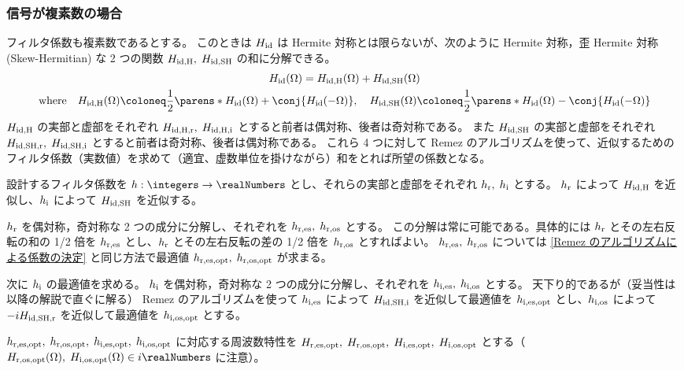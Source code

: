         \subsubsection{信号が複素数の場合}
            フィルタ係数も複素数であるとする。
            このときは $H_{\text{id}}$ は Hermite 対称とは限らないが、次のように Hermite 対称，歪 Hermite 対称 (Skew-Hermitian) な 2 つの関数 $H_{\text{id,H}},\;H_{\text{id,SH}}$ の和に分解できる。
            \begin{gather*}
                \Hid(\Omega) = \HidH(\Omega) + \HidSH(\Omega) \\
                \text{where}\quad\HidH(\Omega)\coloneq\frac{1}{2}\parens*{\Hid(\Omega) + \conj{\Hid(-\Omega)}},\quad\HidSH(\Omega)\coloneq\frac{1}{2}\parens*{\Hid(\Omega) - \conj{\Hid(-\Omega)}}
            \end{gather*}
            $H_{\text{id,H}}$ の実部と虚部をそれぞれ $H_{\text{id,H,r}},\;H_{\text{id,H,i}}$ とすると前者は偶対称、後者は奇対称である。
            また $H_{\text{id,SH}}$ の実部と虚部をそれぞれ $H_{\text{id,SH,r}},\;H_{\text{id,SH,i}}$ とすると前者は奇対称、後者は偶対称である。
            これら 4 つに対して Remez のアルゴリズムを使って、近似するためのフィルタ係数（実数値）を求めて（適宜、虚数単位を掛けながら）和をとれば所望の係数となる。
            \par
            設計するフィルタ係数を $h:\integers\to\realNumbers$ とし、それらの実部と虚部をそれぞれ $h_{\text{r}},\;h_{\text{i}}$ とする。
            $h_{\text{r}}$ によって $H_{\text{id,H}}$ を近似し、$h_{\text{i}}$ によって $H_{\text{id,SH}}$ を近似する。
            \par
            $h_{\text{r}}$ を偶対称，奇対称な 2 つの成分に分解し、それぞれを $h_{\text{r,es}},\;h_{\text{r,os}}$ とする。
            この分解は常に可能である。具体的には $h_{\text{r}}$ とその左右反転の和の 1/2 倍を $h_{\text{r,es}}$ とし、$h_{\text{r}}$ とその左右反転の差の 1/2 倍を $h_{\text{r,os}}$ とすればよい。
            $h_{\text{r,es}},\;h_{\text{r,os}}$ については \ref{Remez のアルゴリズムによる係数の決定} と同じ方法で最適値 $h_{\text{r,es,opt}},\;h_{\text{r,os,opt}}$ が求まる。
            \par
            次に $h_{\text{i}}$ の最適値を求める。
            $h_{\text{i}}$ を偶対称，奇対称な 2 つの成分に分解し、それぞれを $h_{\text{i,es}},\;h_{\text{i,os}}$ とする。
            天下り的であるが（妥当性は以降の解説で直ぐに解る） Remez のアルゴリズムを使って $h_{\text{i,es}}$ によって $H_{\text{id,SH,i}}$ を近似して最適値を $h_{\text{i,es,opt}}$ とし、$h_{\text{i,os}}$ によって $-iH_{\text{id,SH,r}}$ を近似して最適値を $h_{\text{i,os,opt}}$ とする。
            \par
            $h_{\text{r,es,opt}},\;h_{\text{r,os,opt}},\;h_{\text{i,es,opt}},\;h_{\text{i,os,opt}}$ に対応する周波数特性を $H_{\text{r,es,opt}},\;H_{\text{r,os,opt}},\;H_{\text{i,es,opt}},\;H_{\text{i,os,opt}}$ とする（$\HrOsOpt(\Omega),\;\HiOsOpt(\Omega)\in i\realNumbers$ に注意）。
